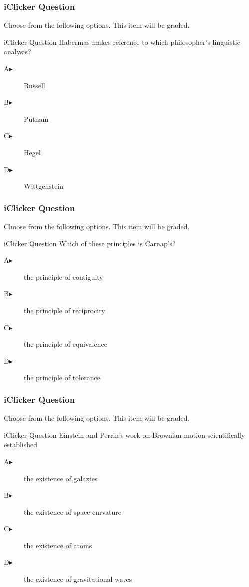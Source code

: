 \documentclass[xcolor=dvipsnames]{beamer}
\begin{document}
\begin{frame}
  \frametitle{iClicker Question}
Choose from the following options. This item will be graded.
\begin{block}{iClicker Question}
Habermas makes reference to which philosopher's linguistic analysis?
\end{block}
\begin{description}
\item[A\hspace{.2in}$\blacktriangleright$] Russell
\item[B\hspace{.2in}$\blacktriangleright$] Putnam
\item[C\hspace{.2in}$\blacktriangleright$] Hegel
\item[D\hspace{.2in}$\blacktriangleright$] Wittgenstein
\end{description}
\end{frame}

\begin{frame}
  \frametitle{iClicker Question}
Choose from the following options. This item will be graded.
\begin{block}{iClicker Question}
Which of these principles is Carnap's?
\end{block}
\begin{description}
\item[A\hspace{.2in}$\blacktriangleright$] the principle of contiguity
\item[B\hspace{.2in}$\blacktriangleright$] the principle of reciprocity
\item[C\hspace{.2in}$\blacktriangleright$] the principle of equivalence
\item[D\hspace{.2in}$\blacktriangleright$] the principle of tolerance
\end{description}
\end{frame}

\begin{frame}
  \frametitle{iClicker Question}
Choose from the following options. This item will be graded.
\begin{block}{iClicker Question}
Einstein and Perrin's work on Brownian motion scientifically
established 
\end{block}
\begin{description}
\item[A\hspace{.2in}$\blacktriangleright$] the existence of galaxies
\item[B\hspace{.2in}$\blacktriangleright$] the existence of space curvature
\item[C\hspace{.2in}$\blacktriangleright$] the existence of atoms
\item[D\hspace{.2in}$\blacktriangleright$] the existence of gravitational waves
\end{description}
\end{frame}
\end{document}
